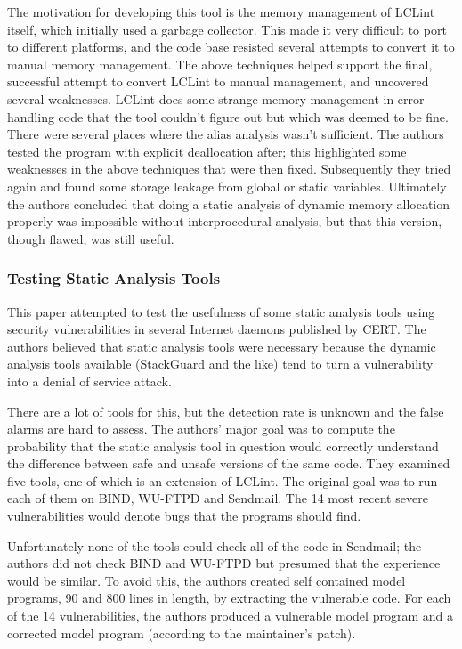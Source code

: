 \documentclass{article}
\begin{document}
\begin{multicols}{2}
The motivation for developing this tool is the memory management of
LCLint itself, which initially used a garbage collector.  This made it
very difficult to port to different platforms, and the code base
resisted several attempts to convert it to manual memory management.
The above techniques helped support the final, successful attempt to
convert LCLint to manual management, and uncovered several weaknesses.
LCLint does some strange memory management in error handling code that
the tool couldn't figure out but which was deemed to be fine.  There
were several places where the alias analysis wasn't sufficient.  The
authors tested the program with explicit deallocation after; this
highlighted some weaknesses in the above techniques that were then
fixed.  Subsequently they tried again and found some storage leakage
from global or static variables.  Ultimately the authors concluded
that doing a static analysis of dynamic memory allocation properly was
impossible without interprocedural analysis, but that this version,
though flawed, was still useful.

\subsubsection{Testing Static Analysis Tools~\cite{zitser04testing}}

This paper attempted to test the usefulness of some static analysis
tools using security vulnerabilities in several Internet daemons
published by CERT.  The authors believed that static analysis tools
were necessary because the dynamic analysis tools available
(StackGuard and the like) tend to turn a vulnerability into a denial
of service attack.

There are a lot of tools for this, but the detection rate is unknown
and the false alarms are hard to assess.  The authors' major goal was
to compute the probability that the static analysis tool in question
would correctly understand the difference between safe and unsafe
versions of the same code.  They examined five tools, one of which is
an extension of LCLint.  The original goal was to run each of them on
BIND, WU-FTPD and Sendmail.  The 14 most recent severe vulnerabilities
would denote bugs that the programs should find.

Unfortunately none of the tools could check all of the code in
Sendmail; the authors did not check BIND and WU-FTPD but presumed that
the experience would be similar.  To avoid this, the authors created
self contained model programs, 90 and 800 lines in length, by
extracting the vulnerable code.  For each of the 14 vulnerabilities,
the authors produced a vulnerable model program and a corrected model
program (according to the maintainer's patch).


\end{multicols}
\end{document}
